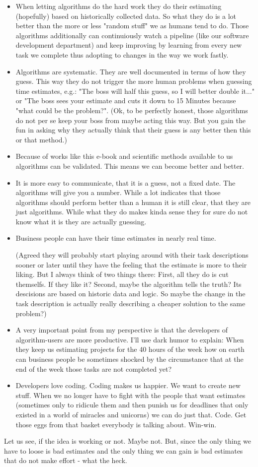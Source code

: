 \begin{itemize}
\tightlist
\item
    When letting algorithms do the hard work they do their estimating (hopefully) based on historically collected data. So what they do is a lot better than the more or less "random stuff" we as humans tend to do. Those algorithms additionally can continuiously watch a pipeline (like our software development department) and keep improving by learning from every new task we complete thus adopting to changes in the way we work fastly.
\item
    Algorithms are systematic. They are well documented in terms of how they guess. This way they do not trigger the more human problems when guessing time estimates, e.g.: "The boss will half this guess, so I will better double it..." or "The boss sees your estimate and cuts it down to 15 Minutes because "what could be the problem?". (Ok, to be perfectly honest, those algorithms do not per se keep your boss from maybe acting this way. But you gain the fun in asking why they actually think that their guess is any better then this or that method.)
\item
  Because of works like this e-book and scientific methods available to us algorithms can be validated. This means we can become better and better.
\item
  It is more easy to communicate, that it is a guess, not a fixed date. The algorithms will give you a number. While a lot indicates that those algorithms should perform better than a human it is still clear, that they are just algorithms. While what they do makes kinda sense they for sure do not know what it is they are actually guessing. 
\item
    Business people can have their time estimates in nearly real time. 

    (Agreed they will probably start playing around with their task descriptions sooner or later until they have the feeling that the estimate is more to their liking. 
    But I always think of two things there: 
    First, all they do is cut themselfs. If they like it? 
    Second, maybe the algorithm tells the truth? Its descisions are based on historic data and logic. So maybe the change in the task description is actually really describing a cheaper solution to the same problem?)
\item
    A very important point from my perspective is that the developers of algorithm-users are more productive.
        I'll use dark humor to explain: 
        When they keep us estimating projects for the 40 hours of the week how on earth can business people be sometimes shocked by the circumstance that at the end of the week those tasks are not completed yet? 
\item
    Developers love coding. Coding makes us happier. We want to create new stuff. When we no longer have to fight with the people that want estimates (sometimes only to ridicule them and then punish us for deadlines that only existed in a world of miracles and unicorns) we can do just that. Code. Get those eggs from that basket everybody is talking about.
        Win-win.
\end{itemize}

Let us see, if the idea is working or not. Maybe not. But, since the only thing we have to loose is bad estimates and the only thing we can gain is bad estimates that do not make effort - what the heck.
